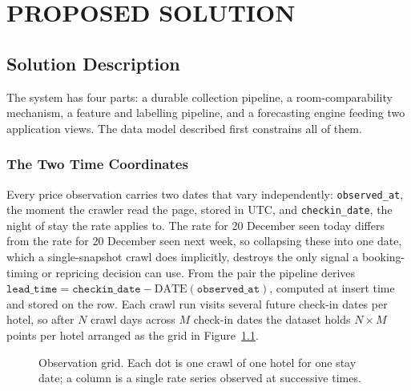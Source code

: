 \chapter{PROPOSED SOLUTION}

\section{Solution Description}

The system has four parts: a durable collection pipeline, a room-comparability mechanism, a feature and labelling pipeline, and a forecasting engine feeding two application views. The data model described first constrains all of them.

\subsection{The Two Time Coordinates}

Every price observation carries two dates that vary independently: \texttt{observed\_at}, the moment the crawler read the page, stored in UTC, and \texttt{checkin\_date}, the night of stay the rate applies to. The rate for 20 December seen today differs from the rate for 20 December seen next week, so collapsing these into one date, which a single-snapshot crawl does implicitly, destroys the only signal a booking-timing or repricing decision can use. From the pair the pipeline derives $\texttt{lead\_time} = \texttt{checkin\_date} - \mathrm{DATE}(\texttt{observed\_at})$, computed at insert time and stored on the row. Each crawl run visits several future check-in dates per hotel, so after $N$ crawl days across $M$ check-in dates the dataset holds $N \times M$ points per hotel arranged as the grid in Figure~\ref{fig:grid}.

\begin{figure}[!htbp]
\centering
{}
\caption{Observation grid. Each dot is one crawl of one hotel for one stay date; a column is a single rate series observed at successive times.}
\label{fig:grid}
\end{figure}

